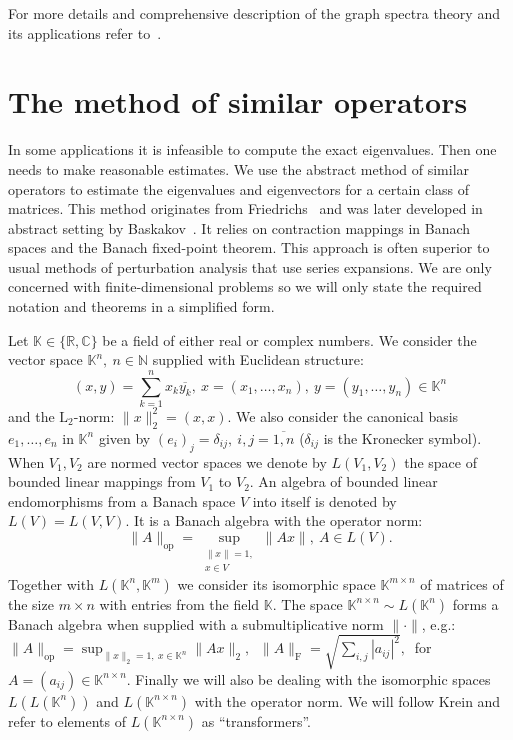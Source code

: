 \documentclass[a4paper]{jpconf}
\begin{document}
For more details and comprehensive description
    of the graph spectra theory
    and its applications
    refer to~\cite{cvetkovic1980spectra,cvetkovic2010introduction,godsil2013algebraic}.

\section{The method of similar operators}

In some applications
    it is infeasible to compute the exact eigenvalues.
Then one needs to make reasonable estimates.
We use the abstract method of similar operators
    to estimate the eigenvalues and eigenvectors
    for a certain class of matrices.
This method originates from Friedrichs~\cite{friedrichs1965advanced}
    and was later developed in abstract setting
    by Baskakov~\cite{baskakov1983methods,baskakov2017method,baskakov2013completeness}.
It relies on contraction mappings in Banach spaces
    and the Banach fixed-point theorem.
This approach is often superior to usual methods of perturbation analysis
    that use series expansions.
We are only concerned with finite-dimensional problems
    so we will only state the required notation and theorems
    in a simplified form.

Let \( \mathbb{K}\in \{ \mathbb{R}, \mathbb{C} \} \)
    be a field of either real or complex numbers.
We consider the vector space \( \mathbb{K}^n,\ n\in \mathbb{N} \)
    supplied with Euclidean structure:
    \[
        (x, y){=}\sum_{k=1}^n x_k\overline{y_k},
        \ x{=}(x_1,\ldots, x_n),
        \ y=(y_1,\ldots, y_n)
        \in \mathbb{K}^n
        \]
    and the \( \mathrm{L}_2 \)-norm:
    \(
        \|x\|_2^2{=}(x,x).
        \)
We also consider the canonical basis \( e_1, \ldots, e_n \)
    in \( \mathbb{K}^n \) given by
    \( {(e_i)}_j = \delta_{ij},\ i,j=\overline{1,n} \)
    (\(\delta_{ij} \) is the Kronecker symbol).
When \( V_1, V_2 \) are normed vector spaces
    we denote by \( L(V_1, V_2) \)
    the space of bounded linear mappings
    from \( V_1 \) to \( V_2 \).
An algebra of bounded linear endomorphisms
    from a Banach space \( V \)
    into itself
    is denoted by \( L(V) = L(V, V) \).
It is a Banach algebra with the operator norm:
    \[
        \|A\|_{\mathrm{op}} =
        \sup_{
            \substack{\|x\|=1,\\ x\in V}
        } \|A x\|,\ A\in L(V).
        \]
Together with \( L(\mathbb{K}^n, \mathbb{K}^m) \)
    we consider its isomorphic space \( \mathbb{K}^{m{\times}n} \)
    of matrices of the size \( m{\times}n \)
    with entries from the field \( \mathbb{K} \).
The space \( \mathbb{K}^{n{\times}n}\sim L(\mathbb{K}^n) \)
    forms a Banach algebra
    when supplied with a submultiplicative norm
    \( \|\cdot\| \),
    e.g.: \( \|A\|_{\mathrm{op}} = \sup_{\|x\|_2=1,\ x\in \mathbb{K}^n} \|A x\|_2,\ \)
    \( \|A\|_{\mathrm{F}} = \sqrt{\sum_{i,j} |a_{ij}|^2},\ \)
    for 
    \( A{=}(a_{ij})\in\mathbb{K}^{n\times n} \).
Finally we will also be dealing with the isomorphic spaces
    \( L(L(\mathbb{K}^n)) \) and \( L(\mathbb{K}^{n{\times}n}) \)
    with the operator norm.
We will follow Krein
    and refer to elements of \( L(\mathbb{K}^{n{\times}n}) \)
    as ``transformers''.
\end{document}
